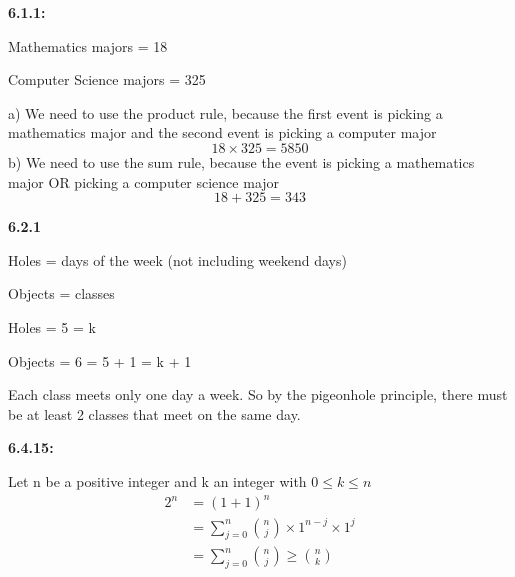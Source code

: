 \documentclass[12pt]{amsart}
\begin{document}
\textbf{6.1.1:}

Mathematics majors = 18

Computer Science majors = 325

a) We need to use the product rule, because the first event is picking a mathematics major and the second event is picking a computer major \[18\times325=5850\]
b) We need to use the sum rule, because the event is picking a mathematics major OR picking a computer science major
\[18+325=343\]

\textbf{6.2.1}

Holes = days of the week (not including weekend days)

Objects = classes

Holes = 5 = k

Objects = 6 = 5 + 1 = k + 1

Each class meets only one day a week. So by the pigeonhole principle, there must be at least 2 classes that meet on the same day.

\textbf{6.4.15:}

Let n be a positive integer and k an integer with $0\leq k\leq n$
\begin{align*}
   2^n  &= (1+1)^n\\
        &= \sum\limits_{j=0}^n \binom{n}{j}\times 1^{n-j}\times 1^j\\
        &= \sum\limits_{j=0}^n \binom{n}{j} \geq \binom{n}{k}
\end{align*}
\end{document}
